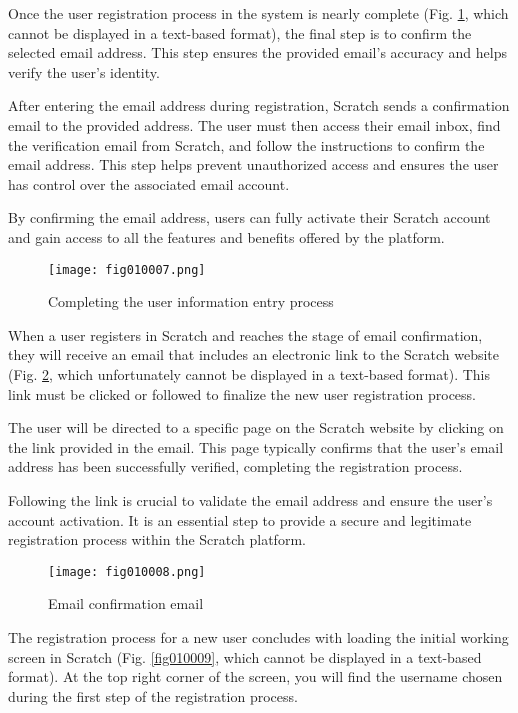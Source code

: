 Once the user registration process in the system is nearly complete (Fig. \ref{fig010007}, which cannot be displayed in a text-based format), the final step is to confirm the selected email address. This step ensures the provided email's accuracy and helps verify the user's identity.

After entering the email address during registration, Scratch sends a confirmation email to the provided address. The user must then access their email inbox, find the verification email from Scratch, and follow the instructions to confirm the email address. This step helps prevent unauthorized access and ensures the user has control over the associated email account.

By confirming the email address, users can fully activate their Scratch account and gain access to all the features and benefits offered by the platform.

\begin{figure}[H]
   \centering
   \texttt{[image: fig010007.png]}
   \caption{Completing the user information entry process}
\label{fig010007}
\end{figure}

When a user registers in Scratch and reaches the stage of email confirmation, they will receive an email that includes an electronic link to the Scratch website (Fig. \ref{fig010008}, which unfortunately cannot be displayed in a text-based format). This link must be clicked or followed to finalize the new user registration process.

The user will be directed to a specific page on the Scratch website by clicking on the link provided in the email. This page typically confirms that the user's email address has been successfully verified, completing the registration process.

Following the link is crucial to validate the email address and ensure the user's account activation. It is an essential step to provide a secure and legitimate registration process within the Scratch platform.

\begin{figure}[H]
   \centering
   \texttt{[image: fig010008.png]}
   \caption{Email confirmation email}
\label{fig010008}
\end{figure}

The registration process for a new user concludes with loading the initial working screen in Scratch (Fig. \ref{fig010009}, which cannot be displayed in a text-based format). At the top right corner of the screen, you will find the username chosen during the first step of the registration process.

